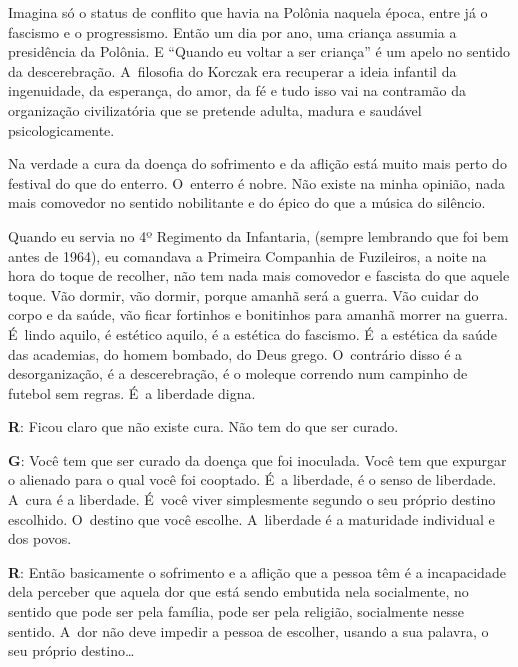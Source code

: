  

Imagina só o status de conflito que havia na Polônia naquela época,
entre já o fascismo e o progressismo. Então um dia por ano, uma criança
assumia a presidência da Polônia. E ``Quando eu voltar a ser criança'' é
um apelo no sentido da descerebração. A~filosofia do Korczak era
recuperar a ideia infantil da ingenuidade, da esperança, do amor, da fé
e tudo isso vai na contramão da organização civilizatória que se
pretende adulta, madura e saudável psicologicamente.

 

Na verdade a cura da doença do sofrimento e da aflição está muito mais
perto do festival do que do enterro. O~enterro é nobre. Não existe na
minha opinião, nada mais comovedor no sentido nobilitante e do épico do
que a música do silêncio.

 

Quando eu servia no 4º Regimento da Infantaria, (sempre lembrando que
foi bem antes de 1964), eu comandava a Primeira Companhia de Fuzileiros,
a noite na hora do toque de recolher, não tem nada mais comovedor e
fascista do que aquele toque. Vão dormir, vão dormir, porque amanhã será
a guerra. Vão cuidar do corpo e da saúde, vão ficar fortinhos e
bonitinhos para amanhã morrer na guerra. É~lindo aquilo, é estético
aquilo, é a estética do fascismo. É~a estética da saúde das academias,
do homem bombado, do Deus grego. O~contrário disso é a desorganização, é
a descerebração, é o moleque correndo num campinho de futebol sem
regras. É~a liberdade digna.

 

\textbf{R}: Ficou claro que não existe cura. Não tem do que ser curado.

 

\textbf{G}: Você tem que ser curado da doença que foi inoculada. Você
tem que expurgar o alienado para o qual você foi cooptado. É~a
liberdade, é o senso de liberdade. A~cura é a liberdade. É~você viver
simplesmente segundo o seu próprio destino escolhido. O~destino que você
escolhe. A~liberdade é a maturidade individual e dos povos.

 

\textbf{R}: Então basicamente o sofrimento e a aflição que a pessoa têm
é a incapacidade dela perceber que aquela dor que está sendo embutida
nela socialmente, no sentido que pode ser pela família, pode ser pela
religião, socialmente nesse sentido. A~dor não deve impedir a pessoa de
escolher, usando a sua palavra, o seu próprio destino…

